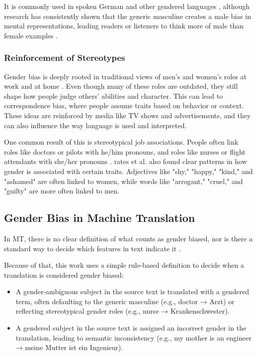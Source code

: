         It is commonly used in spoken German and other gendered languages \parencite{lardelliBuildingBridgesDataset2024,schmitzGermanAllProfessors2022}, although research has consistently shown that the generic masculine creates a male bias in mental representations, leading readers or listeners to think more of male than female examples \parencite{sczesnyCanGenderFairLanguage2016}. 

    \subsubsection{Reinforcement of Stereotypes}
        Gender bias is deeply rooted in traditional views of men’s and women’s roles at work and at home \parencite{godsilEffectsGenderRoles2016}. Even though many of these roles are outdated, they still shape how people judge others’ abilities and character. This can lead to correspondence bias, where people assume traits based on behavior or context. These ideas are reinforced by media like TV shows and advertisements, and they can also influence the way language is used and interpreted.

        One common result of this is stereotypical job associations. People often link roles like doctors or pilots with he/him pronouns, and roles like nurses or flight attendants with she/her pronouns \parencite{shresthaExploringGenderBiases2022}. \textcite{pratesAssessingGenderBias2019} rates et al. also found clear patterns in how gender is associated with certain traits. Adjectives like "shy," "happy," "kind," and "ashamed" are often linked to women, while words like "arrogant," "cruel," and "guilty" are more often linked to men. 

  
 \subsection{Gender Bias in Machine Translation} \label{subsection:definition_gb}
    In MT, there is no clear definition of what counts as gender biased, nor is there a standard way to decide which features in text indicate it \parencite{barclayInvestigatingMarkersDrivers2024a}.

    Because of that, this work uses a simple rule-based definition to decide when a translation is considered gender biased:
        \begin{itemize}
        \item A gender-ambiguous subject in the source text is translated with a gendered term, often defaulting to the generic masculine (e.g., doctor → Arzt) or reflecting stereotypical gender roles (e.g., nurse → Krankenschwester).
        \item A gendered subject in the source text is assigned an incorrect gender in the translation, leading to semantic inconsistency (e.g., my mother is an engineer → meine Mutter ist ein Ingenieur).
        \end{itemize}

